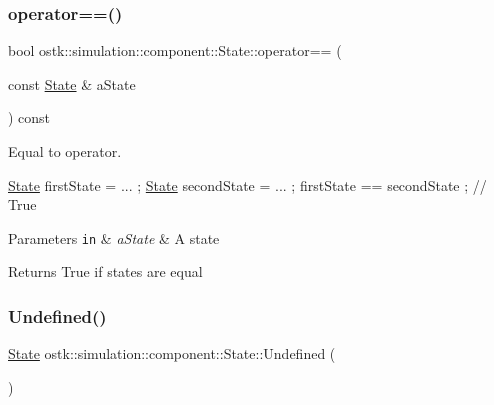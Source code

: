 \mbox{\label{classostk_1_1simulation_1_1component_1_1_state_ad4440388904bac640dc57ffbc5b77019}} 
\subsubsection{\texorpdfstring{operator==()}{operator==()}}
{\footnotesize\ttfamily bool ostk\+::simulation\+::component\+::\+State\+::operator== (\begin{DoxyParamCaption}\item[{const \hyperlink{classostk_1_1simulation_1_1component_1_1_state}{State} \&}]{a\+State }\end{DoxyParamCaption}) const}



Equal to operator. 


\begin{DoxyCode}
\hyperlink{classostk_1_1simulation_1_1component_1_1_state_aef1526b3513a2165970420e7ac8b6dae}{State} firstState = ... ;
\hyperlink{classostk_1_1simulation_1_1component_1_1_state_aef1526b3513a2165970420e7ac8b6dae}{State} secondState = ... ;
firstState == secondState ; \textcolor{comment}{// True}
\end{DoxyCode}



\begin{DoxyParams}[1]{Parameters}
\mbox{\tt in}  & {\em a\+State} & A state \\
\hline
\end{DoxyParams}
\begin{DoxyReturn}{Returns}
True if states are equal 
\end{DoxyReturn}
\mbox{\label{classostk_1_1simulation_1_1component_1_1_state_a21a79240817592992c4791699b2d623f}} 
\subsubsection{\texorpdfstring{Undefined()}{Undefined()}}
{\footnotesize\ttfamily \hyperlink{classostk_1_1simulation_1_1component_1_1_state}{State} ostk\+::simulation\+::component\+::\+State\+::\+Undefined (\begin{DoxyParamCaption}{ }\end{DoxyParamCaption})\hspace{0.3cm}{\ttfamily [static]}}



